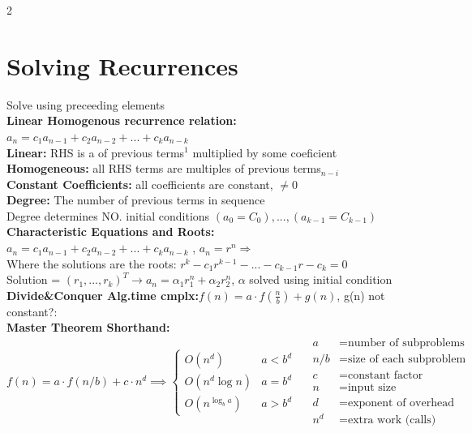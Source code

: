 \documentclass[10pt]{article}
\begin{document}
\begin{multicols*}{2}
\section{Solving Recurrences}
Solve using preceeding elements\\
\textbf{Linear Homogenous recurrence relation:} $a_n = c_1a_{n-1} + c_2a_{n-2}+...+c_ka_{n-k}$\\
\textbf{Linear:} RHS is a  of previous terms$^1$ multiplied by some coeficient\\
\textbf{Homogeneous:} all RHS terms are multiples of previous terms$_{n-i}$\\
\textbf{Constant Coefficients:} all coefficients are constant, $\neq 0$\\
\textbf{Degree:} The number of previous terms in sequence\\
Degree determines NO. initial conditions $(a_0 = C_0),...,(a_{k-1}=C_{k-1})$\\
\textbf{Characteristic Equations and Roots:}\\
$a_n = c_1a_{n-1} + c_2a_{n-2}+...+c_ka_{n-k}$\hspace{0.2cm} , \hspace{0.2cm}$a_n = r^n$\hspace{0.2cm}$\Rightarrow$\hspace{0.2cm}\\
Where the solutions are the roots: $r^k - c_1r^{k-1}-...-c_{k-1}r-c_k=0$\\
Solution = $(r_1,...,r_k)^T \to a_n = \alpha_1r_1^n + \alpha_2r_2^n$, $\alpha$ solved using initial condition\\
\textbf{Divide\&Conquer Alg.time cmplx:}$f(n) = a \cdot f(\frac{n}{b}) + g(n)$, g(n) not constant?:\\
\textbf{Master Theorem Shorthand:}
\begin{equation*}
f(n) = a \cdot f(n/b) + c \cdot n^d \implies 
\begin{cases} 
O(n^d) & a < b^d \\ 
O(n^d \log n) & a = b^d \\ 
O(n^{\log_b a}) & a > b^d 
\end{cases}
\quad 
\begin{aligned}
    a &= \text{number of subproblems} \\
    n/b &= \text{size of each subproblem} \\
    c &= \text{constant factor} \\
    n &= \text{input size} \\
    d &= \text{exponent of overhead} \\
    n^d &= \text{extra work (calls)}
\end{aligned}
\end{equation*}

\end{multicols*}
\end{document}
